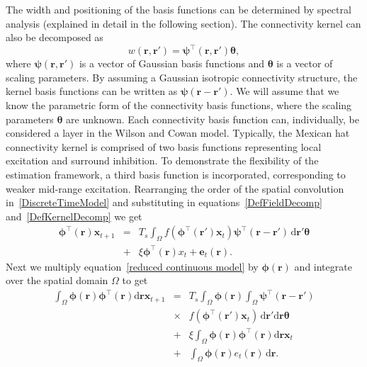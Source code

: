 \documentclass[12pt]{iopart}
\begin{document}
The width and positioning of the basis functions can be determined by spectral analysis (explained in detail in the following section). The connectivity kernel can also be decomposed as 
\begin{equation}\label{DefKernelDecomp}
	 w\left(\mathbf{r},\mathbf{r}'\right) =\boldsymbol{\psi}^\top\left(\mathbf{r},\mathbf{r}'\right) \boldsymbol{\theta},
\end{equation}
where $\boldsymbol{\psi}(\mathbf{r},\mathbf{r}')$ is a vector of Gaussian basis functions and $\boldsymbol{\theta}$ is a vector of scaling parameters. By assuming a Gaussian isotropic connectivity structure, the kernel basis functions can be written as $\boldsymbol{\psi}(\mathbf{r}-\mathbf{r}')$. We will assume that we know the parametric form of the connectivity basis functions, where the scaling parameters $\boldsymbol{\theta}$ are unknown. Each connectivity basis function can, individually, be considered a layer in the Wilson and Cowan model. Typically, the Mexican hat connectivity kernel is comprised of two basis functions representing local excitation and surround inhibition. To demonstrate the flexibility of the estimation framework, a third basis function is incorporated, corresponding to weaker mid-range excitation. Rearranging the order of the spatial convolution in~\ref{DiscreteTimeModel} and substituting in equations~\ref{DefFieldDecomp} and~\ref{DefKernelDecomp} we get 
\begin{eqnarray}
	\label{reduced continuous model}
	\boldsymbol{\phi}^{\top}(\mathbf{r})\mathbf{x}_{t+1} &=& T_s\int_\Omega{f(\boldsymbol{\phi}^{\top}(\mathbf{r}')\mathbf{x}_t )\boldsymbol{\psi}^{\top}(\mathbf{r}-\mathbf{r}') \, \textrm{d}\mathbf{r}'}\boldsymbol{\theta} \nonumber \\
	&+& \xi\boldsymbol{\phi}^{\top}(\mathbf{r})x_t + \mathbf{e}_t(\mathbf{r}). 
\end{eqnarray}
Next we multiply equation~\ref{reduced continuous model} by $\boldsymbol{\phi}(\mathbf{r})$ and integrate over the spatial domain $\Omega$ to get 
\begin{eqnarray}
	\label{StartofReduction}
 	\int_\Omega {\boldsymbol{\phi} \left(\mathbf{r}\right)\boldsymbol{\phi}^{\top}\left(\mathbf{r}\right) \textrm{d}\mathbf{r}} \mathbf{x}_{t+1} &=&
 T_s \int_\Omega \boldsymbol{\phi} (\mathbf{r}) \int_\Omega \boldsymbol{\psi}^{\top} (\mathbf{r}-\mathbf{r}') \nonumber \\
&\times& { f(\boldsymbol{\phi}^{\top}(\mathbf{r}') \mathbf{x}_t ) \, \textrm{d}\mathbf{r}'\textrm{d}\mathbf{r}}\boldsymbol{\theta} \nonumber \\ 
&+& \xi\int_\Omega {\boldsymbol{\phi}(\mathbf{r})\boldsymbol{\phi}^{\top}(\mathbf{r})\textrm{d}\mathbf{r}} \mathbf{x}_t \nonumber \\ &+& 
\int_\Omega{\boldsymbol{\phi} (\mathbf{r}) e_t(\mathbf{r}) \, \textrm{d}\mathbf{r}}. 
\end{eqnarray}
\end{document}
